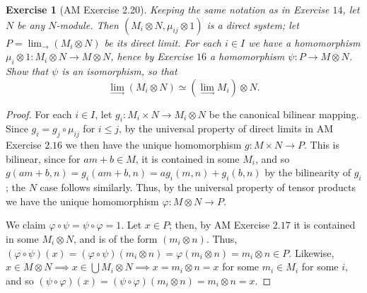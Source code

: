 \documentclass[12pt,letterpaper]{article}
\newtheorem{problem}{Exercise}[section]
\theoremstyle{definition}
\theoremstyle{remark}
\numberwithin{figure}{problem}
\numberwithin{equation}{section}
\begin{document}
\begin{problem}[AM Exercise 2.20]\label{exc:2.20}
  Keeping the same notation as in Exercise $14$, let $N$ be any $N$-module. Then $(M_i \otimes N, \mu_{ij} \otimes 1)$ is a direct system; let $P = \displaystyle\lim_{\longrightarrow}(M_i \otimes N)$ be its direct limit. For each $i \in I$ we have a homomorphism $\mu_i \otimes 1 : M_i \otimes N \to M \otimes N$, hence by Exercise $16$ a homomorphism $\psi : P \to M \otimes N$. Show that $\psi$ is an isomorphism, so that
  \begin{equation*}
    \lim_{\longrightarrow} (M_i \otimes N) \simeq \left( \lim_{\longrightarrow} M_i \right) \otimes N.
  \end{equation*}
\end{problem}
\begin{proof}
  For each $i \in I$, let $g_i : M_i \times N \to M_i \otimes N$ be the canonical bilinear mapping. Since $g_i = g_j \circ \mu_{ij}$ for $i \le j$, by the universal property of direct limits in AM Exercise $2.16$ we then have the unique homomorphism $g : M \times N \to P$. This is bilinear, since for $am+b \in M$, it is contained in some $M_i$, and so $g(am+b,n) = g_i(am+b,n) = ag_i(m,n) + g_i(b,n)$ by the bilinearity of $g_i$; the $N$ case follows similarly. Thus, by the universal property of tensor products we have the unique homomorphism $\varphi : M \otimes N \to P$.
  \par We claim $\varphi \circ \psi = \psi \circ \varphi = 1$. Let $x \in P$; then, by AM Exercise $2.17$ it is contained in some $M_i \otimes N$, and is of the form $(m_i \otimes n)$. Thus, $(\varphi \circ \psi)(x) = (\varphi \circ \psi)(m_i \otimes n) = \varphi(m_i \otimes n) = m_i \otimes n \in P$. Likewise, $x \in M \otimes N \implies x \in \bigcup M_i \otimes N \implies x = m_i \otimes n = x$ for some $m_i \in M_i$ for some $i$, and so $(\psi \circ \varphi)(x) = (\psi \circ \varphi)(m_i \otimes n) = m_i \otimes n = x$.
\end{proof}
\end{document}
